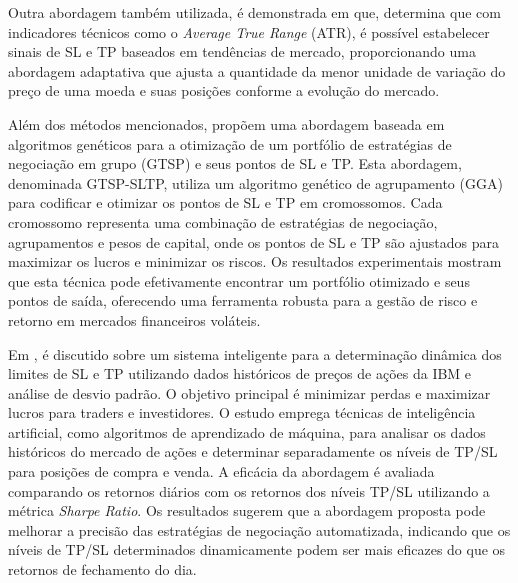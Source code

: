 \documentclass{iftex2024}
\begin{document}
Outra abordagem também utilizada, é demonstrada em \textcite{Vezeris2018} que, determina 
que com indicadores técnicos como o \textit{Average True Range}
(ATR), é possível estabelecer sinais de SL e TP baseados em tendências de mercado,
proporcionando uma abordagem adaptativa que ajusta a quantidade da menor unidade de
variação do preço de uma moeda e suas posições conforme a evolução do mercado.

Além dos métodos mencionados, \textcite{8616576} propõem uma abordagem
baseada em algoritmos genéticos para a otimização de um portfólio de estratégias de
negociação em grupo (GTSP) e seus pontos de SL e TP. Esta abordagem, denominada
GTSP-SLTP, utiliza um algoritmo genético de agrupamento (GGA) para codificar e
otimizar os pontos de SL e TP em cromossomos. Cada cromossomo representa uma
combinação de estratégias de negociação, agrupamentos e pesos de capital, onde os
pontos de SL e TP são ajustados para maximizar os lucros e minimizar os riscos. Os
resultados experimentais mostram que esta técnica pode efetivamente encontrar um
portfólio otimizado e seus pontos de saída, oferecendo uma ferramenta robusta para a
gestão de risco e retorno em mercados financeiros voláteis.

Em \textcite{sivri2023}, é discutido sobre um sistema inteligente para a determinação dinâmica dos limites 
de SL e TP utilizando dados históricos de preços de ações
da IBM e análise de desvio padrão. O objetivo principal é minimizar perdas e maximizar
lucros para traders e investidores. O estudo emprega técnicas de inteligência artificial,
como algoritmos de aprendizado de máquina, para analisar os dados históricos do mercado
de ações e determinar separadamente os níveis de TP/SL para posições de compra e venda.
A eficácia da abordagem é avaliada comparando os retornos diários com os retornos dos
níveis TP/SL utilizando a métrica \textit{Sharpe Ratio}. Os resultados sugerem que a abordagem
proposta pode melhorar a precisão das estratégias de negociação automatizada, indicando
que os níveis de TP/SL determinados dinamicamente podem ser mais eficazes do que os
retornos de fechamento do dia.
\end{document}
